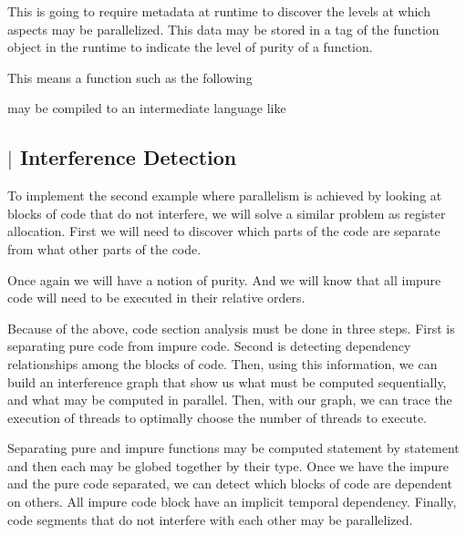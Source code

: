 \documentclass{article}
\begin{document}
\begin{multicols}{2}
This is going to require metadata at runtime to discover the levels at which aspects may
be parallelized. This data may be stored in a tag of the function object in the runtime to
indicate the level of purity of a function.

This means a function such as the following


may be compiled to an intermediate language like


\subsection*{$\vert$ Interference Detection}

To implement the second example where parallelism is achieved by looking at blocks of code
that do not interfere, we will solve a similar problem as register allocation. First
we will need to discover which parts of the code are separate from what other parts of the code.

Once again we will have a notion of purity. And we will know that all impure code will need
to be executed in their relative orders.

Because of the above, code section analysis must be done in three steps. First is separating pure
code from impure code. Second is detecting dependency relationships among the blocks of code.
Then, using this information, we can build an interference graph that show us what must be computed
sequentially, and what may be computed in parallel. Then, with our graph, we can trace the
execution of threads to optimally choose the number of threads to execute.

Separating pure and impure functions may be computed statement by statement and then each may be
globed together by their type. Once we have the impure and the pure code separated, we can detect
which blocks of code are dependent on others. All impure code block have an implicit temporal
dependency. Finally, code segments that do not interfere with each other may be parallelized.

\vspace{\textheight}
\end{multicols}
\end{document}
